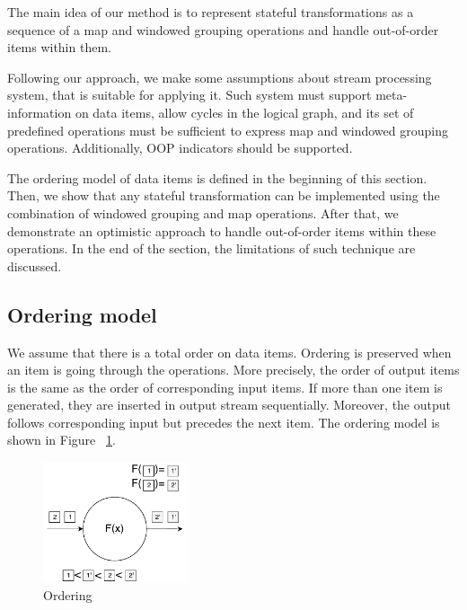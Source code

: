 
\label {fs-optimistic}

The main idea of our method is to represent stateful transformations as a sequence of a map and windowed grouping operations and handle out-of-order items within them. 

Following our approach, we make some assumptions about stream processing system, that is suitable for applying it. Such system must support meta-information on data items, allow cycles in the logical graph, and its set of predefined operations must be sufficient to express map and windowed grouping operations. Additionally, OOP indicators should be supported.

The ordering model of data items is defined in the beginning of this section. Then, we show that any stateful transformation can be implemented using the combination of windowed grouping and map operations. After that, we demonstrate an optimistic approach to handle out-of-order items within these operations. In the end of the section, the limitations of such technique are discussed.

\subsection{Ordering model}
We assume that there is a total order on data items. Ordering is preserved when an item is going through the operations. More precisely, the order of output items is the same as the order of corresponding input items. If more than one item is generated, they are inserted in output stream sequentially. Moreover, the output follows corresponding input but precedes the next item. The ordering model is shown in Figure ~\ref{ordering}.


\begin{figure}[htbp]
  \centering
  \includegraphics[width=0.38\textwidth]{pics/ordering}
  \caption{Ordering}
  \label {ordering}
\end{figure}

